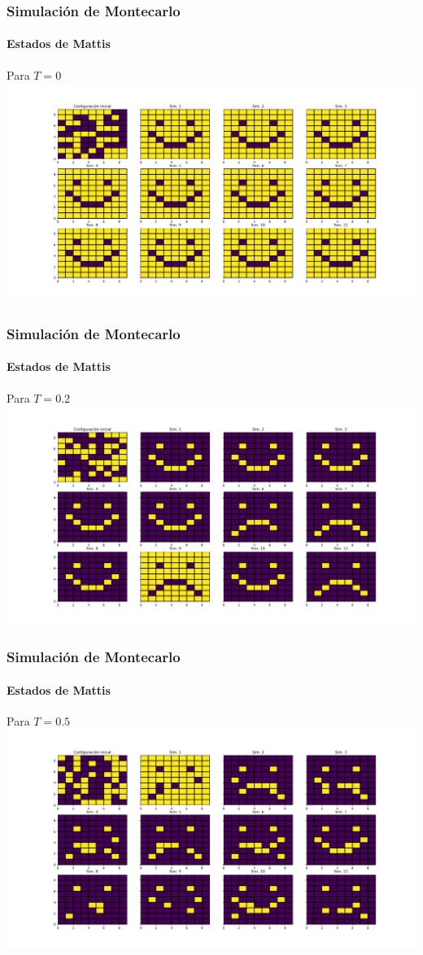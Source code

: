 \documentclass[11pt]{beamer}
\begin{document}
\begin{frame}
\frametitle{Simulación de Montecarlo}
\framesubtitle{Estados de Mattis}
Para $T = 0$
\includegraphics[width=\linewidth]{9x9_T=0.png}

\end{frame}

\begin{frame}
\frametitle{Simulación de Montecarlo}
\framesubtitle{Estados de Mattis}
Para $T = 0.2$
\includegraphics[width=\linewidth]{9x9_T=0,2.png}

\end{frame}

\begin{frame}
\frametitle{Simulación de Montecarlo}
\framesubtitle{Estados de Mattis}
Para $T = 0.5$
\includegraphics[width=\linewidth]{9x9_T=0,5.png}

\end{frame}
\end{document}
